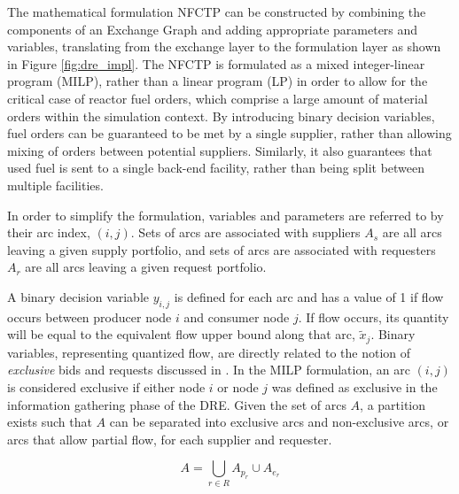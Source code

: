 The mathematical formulation NFCTP can be constructed by combining the
components of an Exchange Graph and adding appropriate parameters and variables,
translating from the exchange layer to the formulation layer as shown in Figure
\ref{fig:dre_impl}. The NFCTP is formulated as a mixed integer-linear program
(MILP), rather than a linear program (LP) in order to allow for the critical
case of reactor fuel orders, which comprise a large amount of material orders
within the simulation context. By introducing binary decision variables, fuel
orders can be guaranteed to be met by a single supplier, rather than allowing
mixing of orders between potential suppliers. Similarly, it also guarantees that
used fuel is sent to a single back-end facility, rather than being split between
multiple facilities.


In order to simplify the formulation, variables and parameters are referred to
by their arc index, $(i, j)$. Sets of arcs are associated with suppliers $A_s$
are all arcs leaving a given supply portfolio, and sets of arcs are associated
with requesters $A_r$ are all arcs leaving a given request portfolio.


A binary decision variable $y_{i,j}$ is defined for each arc and has a value of
1 if flow occurs between producer node $i$ and consumer node $j$. If flow
occurs, its quantity will be equal to the equivalent flow upper bound along that
arc, $\tilde{x}_{j}$. Binary variables, representing quantized flow, are
directly related to the notion of \textit{exclusive} bids and requests discussed
in . In the MILP formulation, an arc $(i, j)$ is considered
exclusive if either node $i$ or node $j$ was defined as exclusive in the
information gathering phase of the DRE. Given the set of arcs $A$, a partition
exists such that $A$ can be separated into exclusive arcs and non-exclusive
arcs, or arcs that allow partial flow, for each supplier and requester.

\begin{equation}\label{eqs:arc-union}
  A = \bigcup_{r \in R} A_{p_r} \cup A_{e_r}
\end{equation}

